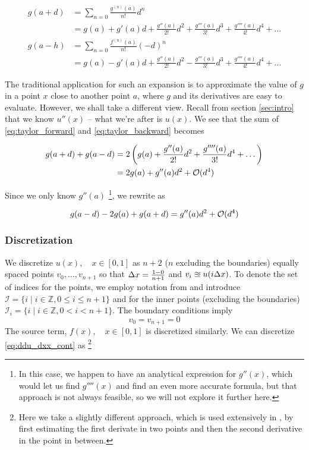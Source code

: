 \documentclass[a4paper]{article}
\begin{document}
\begin{align}
    g(a+d)
    &= \sum_{n=0} \frac{g^{(n)}(a)}{n!} d^n \nonumber \\
    &= g(a) + g'(a) d + \frac{g''(a)}{2!} d^2 + \frac{g'''(a)}{3!} d^3
            + \frac{g''''(a)}{4!} d^4 + \dots \label{eq:taylor_forward}\\
    g(a-h)
    &= \sum_{n=0} \frac{f^{(n)}(a)}{n!} (-d)^n \nonumber \\
    &= g(a) - g'(a) d + \frac{g''(a)}{2!} d^2 - \frac{g'''(a)}{3!} d^3
            + \frac{g''''(a)}{4!} d^4 + \dots \label{eq:taylor_backward}
\end{align}

The traditional application for such an expansion is to approximate the value of $g$ in a point $x$ close to another point $a$, where $g$ and its derivatives are easy to evaluate. However, we shall take a different view. Recall from section \ref{sec:intro} that we know $u''(x)$ -- what we're after is $u(x)$. We see that the sum of \eqref{eq:taylor_forward} and \eqref{eq:taylor_backward} becomes

\begin{align}
    g(a+d) + g(a-d)
        &= 2\left( g(a) + \frac{g''(a)}{2!} d^2 + \frac{g''''(a)}{3!} d^4 + \dots \right) \\
        &= 2g(a) + g''(a) d^2 + {\mathcal{O}}(d^4)
\end{align}

Since we only know $g''(a)$ \footnote{In this case, we happen to have an analytical expression for $g''(x)$, which would let us find $g''''(x)$ and find an even more accurate formula, but that approach is not always feasible, so we will not explore it further here.}, we rewrite as

\begin{equation}
     g(a-d) - 2g(a) + g(a+d) = g''(a)d^2 + {\mathcal{O}}(d^4)
\end{equation}

\subsubsection{Discretization}
We discretize $u(x), \quad x \in [0, 1]$ as $n+2$ ($n$ excluding the boundaries) equally spaced points $v_0, \dots, v_{n+1}$ so that ${\Delta x} = \frac{1 - 0}{n+1}$ and $v_i \approxeq u(i {\Delta x})$. To denote the set of indices for the points, we employ notation from \cite{hpl_fdm} and introduce $\mathcal{I} = \{ i \mid i \in \mathbb{Z}, 0 \leq i \leq n + 1\}$ and for the inner points (excluding the boundaries) $\mathcal{I}_i = \{ i \mid i \in \mathbb{Z}, 0 < i < n + 1\}$.
The boundary conditions imply
\begin{equation}
v_0 = v_{n+1} = 0
\label{eq:boundaries_disc}
\end{equation}
The source term, $f(x), \quad x \in [0, 1]$ is discretized similarly. We can discretize \eqref{eq:ddu_dxx_cont} as
\footnote{Here we take a slightly different approach, which is used extensively in \cite{hpl_fdm}, by first estimating the first derivate in two points and then the second derivative in the point in between.}
\end{document}
